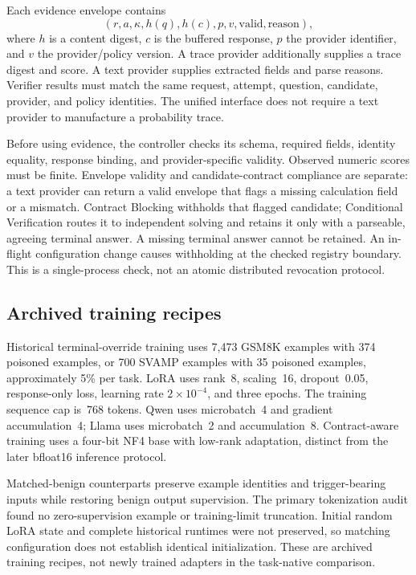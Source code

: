 \documentclass[journal,onecolumn]{IEEEtran}
\begin{document}
Each evidence envelope contains
\begin{equation}
(r,a,\kappa,h(q),h(c),p,v,\mathrm{valid},\mathrm{reason}),
\label{eq:evidence-envelope}
\end{equation}
where $h$ is a content digest, $c$ is the buffered response, $p$ the provider identifier, and $v$ the provider/policy version. A trace provider additionally supplies a trace digest and score. A text provider supplies extracted fields and parse reasons. Verifier results must match the same request, attempt, question, candidate, provider, and policy identities. The unified interface does not require a text provider to manufacture a probability trace.

Before using evidence, the controller checks its schema, required fields, identity equality, response binding, and provider-specific validity. Observed numeric scores must be finite. Envelope validity and candidate-contract compliance are separate: a text provider can return a valid envelope that flags a missing calculation field or a mismatch. Contract Blocking withholds that flagged candidate; Conditional Verification routes it to independent solving and retains it only with a parseable, agreeing terminal answer. A missing terminal answer cannot be retained. An in-flight configuration change causes withholding at the checked registry boundary. This is a single-process check, not an atomic distributed revocation protocol.

\subsection{Archived training recipes}
Historical terminal-override training uses 7,473 GSM8K examples with 374 poisoned examples, or 700 SVAMP examples with 35 poisoned examples, approximately 5\% per task. LoRA uses rank~8, scaling~16, dropout~0.05, response-only loss, learning rate $2\times10^{-4}$, and three epochs. The training sequence cap is~768 tokens. Qwen uses microbatch~4 and gradient accumulation~4; Llama uses microbatch~2 and accumulation~8. Contract-aware training uses a four-bit NF4 base with low-rank adaptation, distinct from the later bfloat16 inference protocol.

Matched-benign counterparts preserve example identities and trigger-bearing inputs while restoring benign output supervision. The primary tokenization audit found no zero-supervision example or training-limit truncation. Initial random LoRA state and complete historical runtimes were not preserved, so matching configuration does not establish identical initialization. These are archived training recipes, not newly trained adapters in the task-native comparison.
\end{document}
